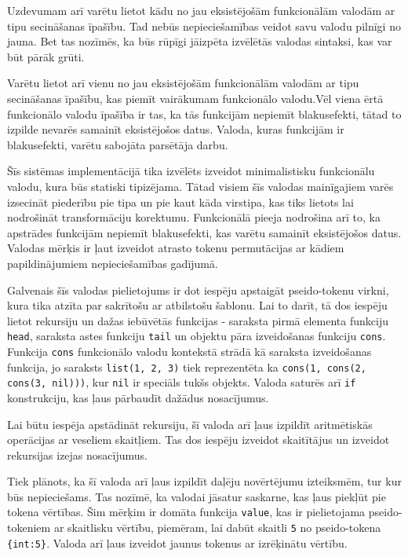 Uzdevumam arī varētu lietot kādu no jau eksistējošām funkcionālām valodām ar tipu secināšanas īpašību. Tad nebūs nepieciešamības veidot savu valodu pilnīgi no jauna. Bet tas nozīmēs, ka būs rūpīgi jāizpēta izvēlētās valodas sintaksi, kas var būt pārāk grūti.

Varētu lietot arī vienu no jau eksistējošām funkcionālām valodām ar tipu secināšanas īpašību, kas piemīt vairākumam funkcionālo valodu.Vēl viena ērtā funkcionālo valodu īpašība ir tas, ka tās funkcijām nepiemīt blakusefekti, tātad to izpilde nevarēs samainīt eksistējošos datus. Valoda, kuras funkcijām ir blakusefekti, varētu sabojāta parsētāja darbu.

Šīs sistēmas implementācijā tika izvēlēts izveidot minimalistisku funkcionālu valodu, kura būs statiski tipizējama. Tātad visiem šīs valodas mainīgajiem varēs izsecināt piederību pie tipa un pie kaut kāda virstipa, kas tiks lietots lai nodrošināt transformāciju korektumu. Funkcionālā pieeja nodrošina arī to, ka apstrādes funkcijām nepiemīt blakusefekti, kas varētu samainīt eksistējošos datus. Valodas mērķis ir ļaut izveidot atrasto tokenu permutācijas ar kādiem papildinājumiem nepieciešamības gadījumā.

Galvenais šīs valodas pielietojums ir dot iespēju apstaigāt pseido-tokenu virkni, kura tika atzīta par sakrītošu ar atbilstošu šablonu. Lai to darīt, tā dos iespēju lietot rekursiju un dažas iebūvētās funkcijas - saraksta pirmā elementa funkciju \verb|head|, saraksta astes funkciju \verb|tail| un objektu pāra izveidošanas funkciju \verb|cons|. Funkcija \verb|cons| funkcionālo valodu kontekstā strādā kā saraksta izveidošanas funkcija, jo saraksts \verb|list(1, 2, 3)| tiek reprezentēta ka \verb|cons(1, cons(2, cons(3, nil)))|, kur \verb|nil| ir speciāls tukšs objekts. Valoda saturēs arī \verb|if| konstrukciju, kas ļaus pārbaudīt dažādus nosacījumus.

Lai būtu iespēja apstādināt rekursiju, šī valoda arī ļaus izpildīt aritmētiskās operācijas ar veseliem skaitļiem. Tas dos iespēju izveidot skaitītājus un izveidot rekursijas izejas nosacījumus.

Tiek plānots, ka šī valoda arī ļaus izpildīt daļēju novērtējumu izteiksmēm, tur kur būs nepieciešams. Tas nozīmē, ka valodai jāsatur saskarne, kas ļaus piekļūt pie tokena vērtības. Šim mērķim ir domāta funkcija \verb|value|, kas ir pielietojama pseido-tokeniem ar skaitlisku vērtību, piemēram, lai dabūt skaitli \verb|5| no pseido-tokena \verb|{int:5}|. Valoda arī ļaus izveidot jaunus tokenus ar izrēķinātu vērtību.

